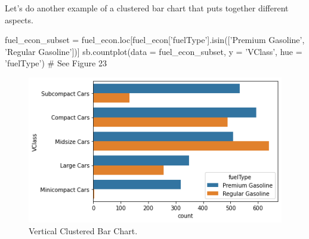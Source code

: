 Let's do another example of a clustered bar chart that puts together different aspects.

\begin{python}
	fuel_econ_subset = fuel_econ.loc[fuel_econ['fuelType'].isin(['Premium Gasoline', 'Regular Gasoline'])]
	sb.countplot(data = fuel_econ_subset, y = 'VClass', hue = 'fuelType')
	# See Figure 23
\end{python}

\begin{figure}
	\includegraphics{images/figure23.png}
	\caption{Vertical Clustered Bar Chart.}\label{fig:figure23}
\end{figure}



